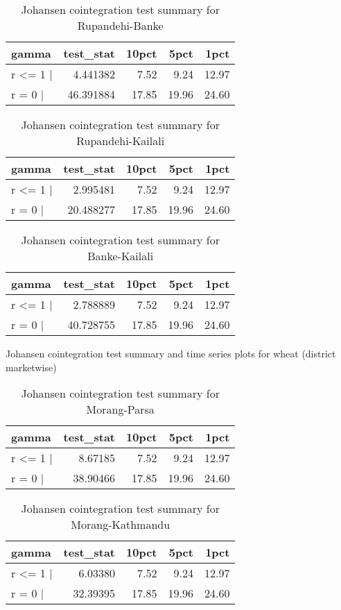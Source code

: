 \documentclass[
  12pt,
]{article}
\begin{document}
\begin{longtable}[t]{lrrrr}
\caption{\label{tab:rice-cajo-test}Johansen cointegration test summary for Rupandehi-Banke}\\
\toprule
gamma & test\_stat & 10pct & 5pct & 1pct\\
\midrule
r <= 1 | & 4.441382 & 7.52 & 9.24 & 12.97\\
r = 0  | & 46.391884 & 17.85 & 19.96 & 24.60\\
\bottomrule
\end{longtable}

\begin{longtable}[t]{lrrrr}
\caption{\label{tab:rice-cajo-test}Johansen cointegration test summary for Rupandehi-Kailali}\\
\toprule
gamma & test\_stat & 10pct & 5pct & 1pct\\
\midrule
r <= 1 | & 2.995481 & 7.52 & 9.24 & 12.97\\
r = 0  | & 20.488277 & 17.85 & 19.96 & 24.60\\
\bottomrule
\end{longtable}

\begin{longtable}[t]{lrrrr}
\caption{\label{tab:rice-cajo-test}Johansen cointegration test summary for Banke-Kailali}\\
\toprule
gamma & test\_stat & 10pct & 5pct & 1pct\\
\midrule
r <= 1 | & 2.788889 & 7.52 & 9.24 & 12.97\\
r = 0  | & 40.728755 & 17.85 & 19.96 & 24.60\\
\bottomrule
\end{longtable}

Johansen cointegration test summary and time series plots for wheat (district marketwise)

\begin{longtable}[t]{lrrrr}
\caption{\label{tab:wheat-cajo-test}Johansen cointegration test summary for Morang-Parsa}\\
\toprule
gamma & test\_stat & 10pct & 5pct & 1pct\\
\midrule
r <= 1 | & 8.67185 & 7.52 & 9.24 & 12.97\\
r = 0  | & 38.90466 & 17.85 & 19.96 & 24.60\\
\bottomrule
\end{longtable}

\begin{longtable}[t]{lrrrr}
\caption{\label{tab:wheat-cajo-test}Johansen cointegration test summary for Morang-Kathmandu}\\
\toprule
gamma & test\_stat & 10pct & 5pct & 1pct\\
\midrule
r <= 1 | & 6.03380 & 7.52 & 9.24 & 12.97\\
r = 0  | & 32.39395 & 17.85 & 19.96 & 24.60\\
\bottomrule
\end{longtable}
\end{document}
